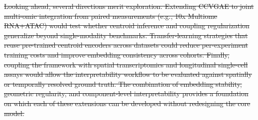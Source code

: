 \documentclass[referee, pdflatex, sn-vancouver-num]{sn-jnl}
\providecommand{\DIFdeltex}[1]{{\protect\color{red}\sout{#1}}}                      %
\providecommand{\DIFaddbegin}{} %
\providecommand{\DIFaddend}{} %
\providecommand{\DIFdelbegin}{} %
\providecommand{\DIFdelend}{} %
\providecommand{\DIFdel}[1]{\texorpdfstring{\DIFdeltex{#1}}{}} %
\newcommand{\DIFscaledelfig}{0.5}
\newlength{\DIFdelgraphicswidth} %
\newlength{\DIFdelgraphicsheight} %
\newcommand{\DIFaddincludegraphics}[2][]{{\color{blue}\fbox{\DIFOincludegraphics[#1]{#2}}}} %
\newcommand{\DIFdelincludegraphics}[2][]{%
\sbox{\DIFdelgraphicsbox}{\DIFOincludegraphics[#1]{#2}}%
\settoboxwidth{\DIFdelgraphicswidth}{\DIFdelgraphicsbox} %
\settoboxtotalheight{\DIFdelgraphicsheight}{\DIFdelgraphicsbox} %
\scalebox{\DIFscaledelfig}{%
\parbox[b]{\DIFdelgraphicswidth}{\usebox{\DIFdelgraphicsbox}\\[-\baselineskip] \rule{\DIFdelgraphicswidth}{0em}}\llap{\resizebox{\DIFdelgraphicswidth}{\DIFdelgraphicsheight}{%
\setlength{\unitlength}{\DIFdelgraphicswidth}%
\begin{picture}(1,1)%
\thicklines\linethickness{2pt} %
{\color[rgb]{1,0,0}\put(0,0){\framebox(1,1){}}}%
{\color[rgb]{1,0,0}\put(0,0){\line( 1,1){1}}}%
{\color[rgb]{1,0,0}\put(0,1){\line(1,-1){1}}}%
\end{picture}%
}\hspace*{3pt}}} %
} %
\DeclareRobustCommand{\DIFaddbegin}{\DIFOaddbegin \let\includegraphics\DIFaddincludegraphics} %
\DeclareRobustCommand{\DIFaddend}{\DIFOaddend \let\includegraphics\DIFOincludegraphics} %
\DeclareRobustCommand{\DIFdelbegin}{\DIFOdelbegin \let\includegraphics\DIFdelincludegraphics} %
\DeclareRobustCommand{\DIFdelend}{\DIFOaddend \let\includegraphics\DIFOincludegraphics} %
\begin{document}
\DIFdelbegin \DIFdel{Looking ahead, several directions merit exploration. Extending CCVGAE to joint multi-omic integration from paired measurements (e.g., 10x Multiome RNA+ATAC) would test whether centroid inference and coupling regularization generalize beyond single-modality benchmarks. Transfer-learning strategies that reuse pre-trained centroid encoders across datasets could reduce per-experiment training costs and improve embedding consistency across cohorts. Finally, coupling the framework with spatial transcriptomics and longitudinal single-cell assays would allow the interpretability workflow to be evaluated against spatially or temporally resolved ground truth. The combination of embedding stability, geometric regularity, and component-level interpretability provides a foundation on which each of these extensions can be developed without redesigning the core model.
}\DIFdelend \DIFaddbegin \begin{appendices}
\DIFaddend


\end{appendices}
\end{document}
